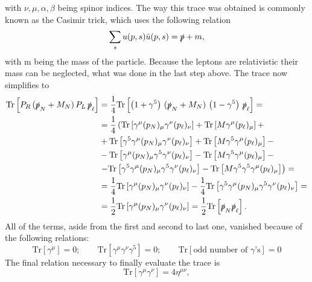 with $\nu,\mu,\alpha,\beta$ being spinor indices.\newline\indent
The way this trace was obtained is commonly known as the Casimir trick, which uses the following relation
\begin{equation*}
	\sum_s u(p,s)\bar{u}(p,s)=\slashed p +m,
\end{equation*}
with m being the mass of the particle. \newline\indent
Because the leptons are relativistic their mass can be neglected, what was done in the last step above.\newline\indent
The trace now simplifies to
\begin{align*}
	\text{Tr}\left[P_R\,(\slashed p_N+M_N)\, P_L\,\slashed p_\ell\right]&=\frac{1}{4}\text{Tr}\left[\left(1+\gamma^5\right)\,(\slashed p_N+M_N)\,\left(1-\gamma^5\right)\,\slashed p_\ell\right]=\\
	&=\frac{1}{4}\left(\text{Tr}\left[\gamma^\mu (p_N)_\mu \gamma^\nu (p_\ell)_\nu\right]+ \text{Tr}\left[M\gamma^\mu (p_\ell)_\mu\right]+\right.\\ 
	&+\text{Tr}\left[\gamma^5\gamma^\mu (p_N)_\mu\gamma^\nu (p_\ell)_\nu\right]+ \text{Tr}\left[M\gamma^5\gamma^\mu (p_\ell)_\mu\right]-\\
	 &-\text{Tr}\left[\gamma^\mu (p_N)_\mu\gamma^5\gamma^\nu (p_\ell)_\nu\right]- \text{Tr}\left[M\gamma^5\gamma^\mu (p_\ell)_\mu\right]-\\
	  &\left.-\text{Tr}\left[\gamma^5\gamma^\mu (p_N)_\mu\gamma^5\gamma^\nu (p_\ell)_\nu\right]- \text{Tr}\left[M\gamma^5\gamma^5\gamma^\mu (p_\ell)_\mu\right] \right)=\\
	&=\frac{1}{4}\text{Tr}\left[\gamma^\mu (p_N)_\mu\gamma^\nu (p_\ell)_\nu\right]-\frac{1}{4}\text{Tr}\left[\gamma^5\gamma^\mu (p_N)_\mu\gamma^5\gamma^\nu (p_\ell)_\nu\right]=\\
	&=\frac{1}{2}\text{Tr}\left[\gamma^\mu (p_N)_\mu\gamma^\nu (p_\ell)_\nu\right]=\frac{1}{2}\text{Tr}\left[\slashed p_N \slashed p_\ell\right].
\end{align*}
All of the terms, aside from the first and second to last one, vanished because of the following relations:
\begin{equation*}
	\text{Tr}\left[\gamma^\mu\right]=0; \qquad \text{Tr}\left[\gamma^\mu\gamma^\nu\gamma^5\right]=0;\qquad \text{Tr}\left[\text{odd number of $\gamma$'s}\right]=0
\end{equation*}
The final relation necessary to finally evaluate the trace is
\begin{equation*}
	\text{Tr}[\gamma^\mu\gamma^\nu]=4\eta^{\mu\nu},
\end{equation*}
